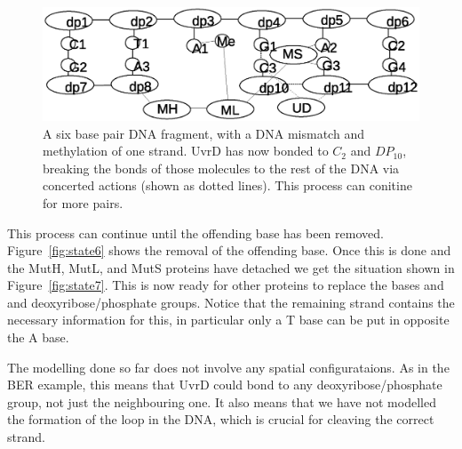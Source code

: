 \documentclass[review]{elsarticle}
\begin{document}
\begin{figure}[h!]
  \centering
    \includegraphics[width=1.0\textwidth]{mmr/state4}
  \caption[A six base pair DNA fragment.]{A six base pair DNA fragment, with a DNA mismatch and methylation of one strand. UvrD has now bonded to $C_2$ and $DP_{10}$, breaking the bonds of those molecules to the rest of the DNA via concerted actions (shown as dotted lines). This process can conitine for more pairs.}
  \label{fig:state4}
\end{figure}

This process can continue until the offending base has been removed. Figure~\ref{fig:state6} shows the removal of the offending base. Once this is done and the MutH, MutL, and MutS proteins have detached we get the situation shown in Figure~\ref{fig:state7}. This is now ready for other proteins to replace the bases and and deoxyribose/phosphate groups. Notice that the remaining strand contains the necessary information for this, in particular only a T base can be put in opposite the A base.
%
%

The modelling done so far does not involve any spatial configurataions. As in the BER example, this means that UvrD could bond to any deoxyribose/phosphate group, not just the neighbouring one. It also means that we have not modelled the formation of the loop in the DNA, which is crucial for cleaving the correct strand.
%
%
\end{document}
